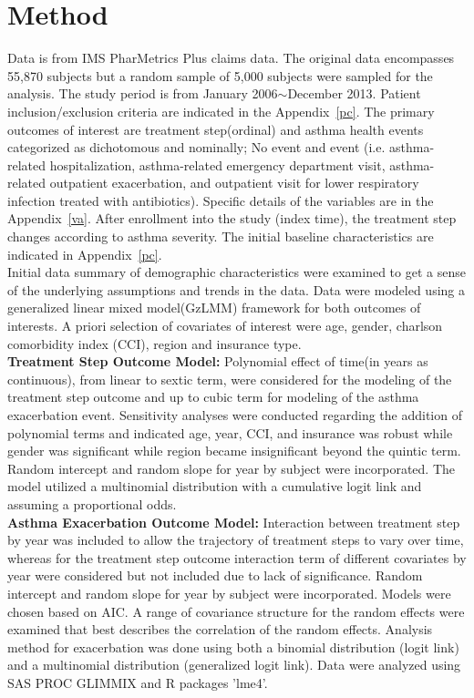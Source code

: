 \documentclass[10pt,a4paper,fleqn]{article}
\begin{document}
\section{Method}
Data is from IMS PharMetrics Plus claims data\cite{LifeLink}. The original data encompasses 55,870 subjects but a random sample of 5,000 subjects were sampled for the analysis. The study period is from January 2006$\sim$December 2013. Patient inclusion/exclusion criteria are indicated in the Appendix~\ref{pc}. The primary outcomes of interest are treatment step(ordinal) and asthma health events categorized as dichotomous and nominally; No event and event (i.e. asthma-related hospitalization, asthma-related emergency department visit, asthma-related outpatient exacerbation, and outpatient visit for lower respiratory infection treated with antibiotics). Specific details of the variables are in the Appendix~\ref{va}. After enrollment into the study (index time), the treatment step changes according to asthma severity. The initial baseline characteristics are indicated in Appendix~\ref{pc}. 
\\
Initial data summary of demographic characteristics were examined to get a sense of the underlying assumptions and trends in the data. Data were modeled using a generalized linear mixed model(GzLMM) framework for both outcomes of interests. A priori selection of covariates of interest were age, gender, charlson comorbidity index (CCI), region and insurance type. \\
\textbf{Treatment Step Outcome Model:} Polynomial effect of time(in years as continuous), from linear to sextic term, were considered for the modeling of the treatment step outcome and up to cubic term for modeling of the asthma exacerbation event. Sensitivity analyses were conducted regarding the addition of polynomial terms and indicated age, year, CCI, and insurance was robust while gender was significant while region became insignificant beyond the quintic term. Random intercept and random slope for year by subject were incorporated. The model utilized a multinomial distribution with a cumulative logit link and assuming a proportional odds\cite{hedeker2008multilevel}. \\
\textbf{Asthma Exacerbation Outcome Model:} Interaction between treatment step by year was included to allow the trajectory of treatment steps to vary over time, whereas for the treatment step outcome interaction term of different covariates by year were considered but not included due to lack of significance. Random intercept and random slope for year by subject were incorporated. Models were chosen based on AIC. A range of covariance structure for the random effects were examined that best describes the correlation of the random effects. Analysis method for exacerbation was done using both a binomial distribution (logit link) and a multinomial distribution (generalized logit link). Data were analyzed using SAS PROC GLIMMIX and R packages 'lme4'. 
\end{document}
